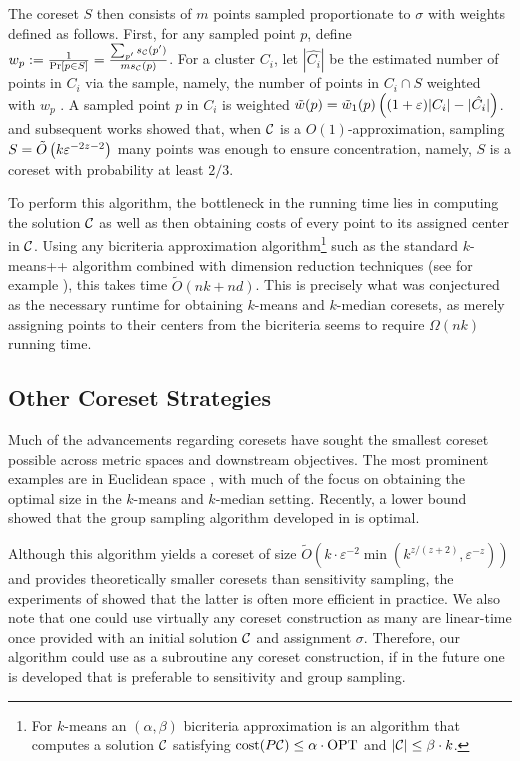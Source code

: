 The coreset $S$ then consists of $m$ points sampled proportionate to $\sigma$ with weights defined as follows. First, for any sampled point $p$, define $w_p :=
\frac{1}{\Pr[p \in S]} = \frac{\sum_{p'} s_\mathcal C(p')}{m s_\mathcal C(p)}$. For a cluster $C_i$, let $|\hat{C_i}|$ be the estimated number of points in $C_i$ via the
sample, namely, the number of points in $C_i \cap S$ weighted with $w_p$ . A sampled point $p$ in $C_i$ is
weighted $\tilde w(p) = \tilde w_1(p) \left( (1+\varepsilon)|C_i| - |\hat{C_i}|\right)$.  \cite{FeldmanL11} and subsequent works showed that, when $\mathcal C$ is
a $O(1)$-approximation, sampling $S = \tilde O\left( k \varepsilon^{-2z-2}\right)$ many points was enough to ensure concentration, namely, $S$ is a coreset with
probability at least $2/3$.

To perform this algorithm, the bottleneck in the running time lies in computing the solution $\mathcal C$ as well as then obtaining costs of every point to its
assigned center in $\mathcal C$. Using any bicriteria approximation algorithm\footnote{For $k$-means an $(\alpha,\beta)$ bicriteria approximation is an algorithm
that computes a solution $\mathcal C$ satisfying $\operatorname{cost}(P\mathcal C)\leq \alpha\cdot \text{OPT}$ and $|\mathcal C|\leq \beta\cdot k$.} such as the standard $k$-means++ algorithm
\cite{ArV07} combined with dimension reduction techniques (see for example \cite{BecchettiBC0S19,CohenEMMP15,MakarychevMR19}), this takes time $\tilde O(nk
+nd)$. This is precisely what was conjectured as the necessary runtime for obtaining $k$-means and $k$-median coresets, as merely assigning points to their
centers from the bicriteria seems to require $\Omega(nk)$ running time.

\subsection{Other Coreset Strategies}
\label{ssec:clustering_prelim}

Much of the advancements regarding coresets have sought the smallest coreset possible across metric spaces and downstream objectives. The most prominent
examples are in Euclidean space \cite{BadoiuHI02, HaM04, Chen09, HuangV20, stoc22}, with much of the focus on obtaining the optimal size in the $k$-means and
$k$-median setting. Recently, a lower bound \cite{huangLB} showed that the group sampling algorithm developed in \cite{stoc21, stoc22} is optimal.

Although this algorithm yields a coreset of size $\tilde{O}(k\cdot \varepsilon^{-2}
\min(k^{z/(z+2)},\varepsilon^{-z}))$ \cite{CLSSS22} and provides theoretically smaller coresets than sensitivity sampling, the experiments of \cite{chrisESA}
showed that the latter is often more efficient in practice. We also note that one could use virtually any coreset construction as many are linear-time once
provided with an initial solution $\mathcal C$ and assignment $\sigma$.  Therefore, our algorithm could use as a subroutine any coreset construction, if in the
future one is developed that is preferable to sensitivity and group sampling.

